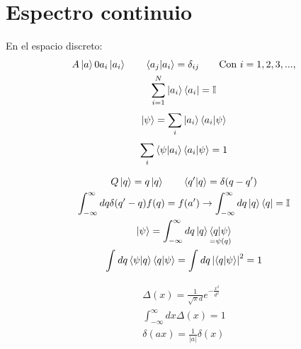 \documentclass{article}
\newcommand{\caja}[3]{%
  \begin{tcolorbox}[colback=#1!5!white,colframe=#1!25!black,title=#2]
    #3
  \end{tcolorbox}%
}
\begin{document}
\section{Espectro continuio}
En el espacio discreto:
\begin{gather}
  A \ket{a } 0 a_i \ket{a_i } \qquad \bra{a_j }\ket{a_i } = \delta _{ij } \qquad \text{Con } i = 1,2,3,...,\\
  \sum_{i = 1 }^{N } \ket{a_i }\bra{a_i } = \mathbb{I}\\
  \ket{\psi} = \sum_{i }^{}\ket{a_i }\bra{a_i }\ket{\psi} \\
  \sum_{i }^{}\bra{\psi}\ket{a_i }\bra{a_i }\ket{\psi } = 1  
\end{gather}

\caja{green}{En el espacio continuo }{
  \begin{gather}
    Q \ket{q } = q \ket{q } \qquad \bra{q'}\ket{q} = \delta(q-q')\\
    \int_{-\infty}^{\infty} dq \delta(q'-q)f(q) = f(a') \rightarrow \int_{-\infty}^{\infty}dq \ket{q}\bra{q } = \mathbb{I}\\
    \ket{\psi} = \int_{-\infty}^{\infty}dq \ket{q }\underset{=\psi(q)}{\bra{q}\ket{\psi}}\\
    \int_{}^{}dq \bra{\psi}\ket{q}\bra{q}\ket{\psi} = \int_{}^{}dq \left|\bra{q}\ket{\psi} \right|^2 = 1
  \end{gather}
}
\begin{gather}
  \Delta(x) = \frac{1}{\sqrt{\pi} d }e ^ {- \frac{x ^2}{d ^2}} \\
  \int_{-\infty}^{\infty}dx \Delta (x) = 1\\
  \delta(ax) = \frac{1}{\left|a \right|}\delta(x)
\end{gather}
\end{document}
